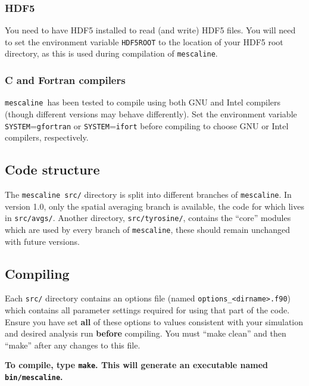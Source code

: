 \documentclass[a4paper]{article}
\newcommand{\mesc}{\texttt{mescaline}}
\begin{document}
\subsubsection{HDF5}

You need to have HDF5 installed to read (and write) HDF5 files. You will need to set the environment variable \texttt{HDF5ROOT} to the location of your HDF5 root directory, as this is used during compilation of \mesc. 

\subsubsection{C and Fortran compilers}

\mesc\, has been tested to compile using both GNU and Intel compilers (though different versions may behave differently). Set the environment variable \texttt{SYSTEM}=\texttt{gfortran} or \texttt{SYSTEM}=\texttt{ifort} before compiling to choose GNU or Intel compilers, respectively. 

\subsection{Code structure}

The \mesc\ \texttt{src/} directory is split into different branches of \mesc. In version 1.0, only the spatial averaging branch is available, the code for which lives in \texttt{src/avgs/}. Another directory, \texttt{src/tyrosine/}, contains the ``core'' modules which are used by every branch of \mesc, these should remain unchanged with future versions. 


\subsection{Compiling}

Each \texttt{src/} directory contains an options file (named \texttt{options\_<dirname>.f90}) which contains all parameter settings required for using that part of the code. Ensure you have set {\bf all} of these options to values consistent with your simulation and desired analysis run {\bf before} compiling. You must ``make clean'' and then ``make'' after any changes to this file. 

{\bf To compile, type \texttt{make}. This will generate an executable named \texttt{bin/mescaline}.}
\end{document}
